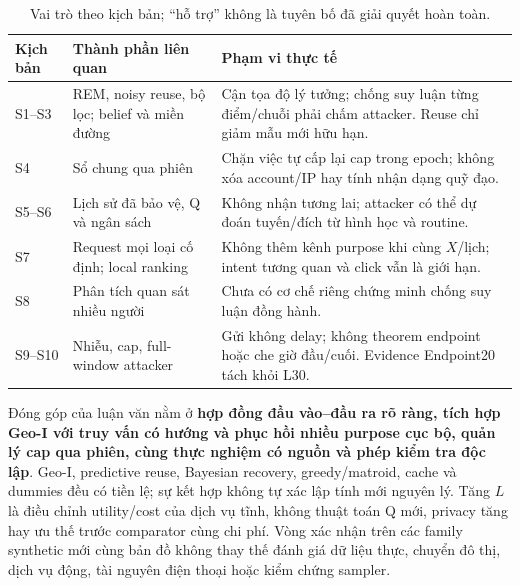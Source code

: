 \begin{table}[htbp]\centering\small
\caption{Vai trò theo kịch bản; ``hỗ trợ'' không là tuyên bố đã giải quyết hoàn toàn.}
\begin{tabularx}{\textwidth}{P{2.0cm}P{4.2cm}Y}\toprule
Kịch bản & Thành phần liên quan & Phạm vi thực tế\\\midrule
S1--S3 & REM, noisy reuse, bộ lọc; belief và miền đường & Cận tọa độ lý tưởng; chống suy luận từng điểm/chuỗi phải chấm attacker. Reuse chỉ giảm mẫu mới hữu hạn.\\
S4 & Sổ chung qua phiên & Chặn việc tự cấp lại cap trong epoch; không xóa account/IP hay tính nhận dạng quỹ đạo.\\
S5--S6 & Lịch sử đã bảo vệ, Q và ngân sách & Không nhận tương lai; attacker có thể dự đoán tuyến/đích từ hình học và routine.\\
S7 & Request mọi loại cố định; local ranking & Không thêm kênh purpose khi cùng $X$/lịch; intent tương quan và click vẫn là giới hạn.\\
S8 & Phân tích quan sát nhiều người & Chưa có cơ chế riêng chứng minh chống suy luận đồng hành.\\
S9--S10 & Nhiễu, cap, full-window attacker & Gửi không delay; không theorem endpoint hoặc che giờ đầu/cuối. Evidence Endpoint20 tách khỏi L30.\\\bottomrule
\end{tabularx}
\end{table}

Đóng góp của luận văn nằm ở \textbf{hợp đồng đầu vào--đầu ra rõ ràng, tích hợp Geo-I với truy vấn có hướng và phục hồi nhiều purpose cục bộ, quản lý cap qua phiên, cùng thực nghiệm có nguồn và phép kiểm tra độc lập}. Geo-I, predictive reuse, Bayesian recovery, greedy/matroid, cache và dummies đều có tiền lệ; sự kết hợp không tự xác lập tính mới nguyên lý. Tăng $L$ là điều chỉnh utility/cost của dịch vụ tĩnh, không thuật toán Q mới, privacy tăng hay ưu thế trước comparator cùng chi phí. Vòng xác nhận trên các family synthetic mới cùng bản đồ không thay thế đánh giá dữ liệu thực, chuyển đô thị, dịch vụ động, tài nguyên điện thoại hoặc kiểm chứng sampler.
